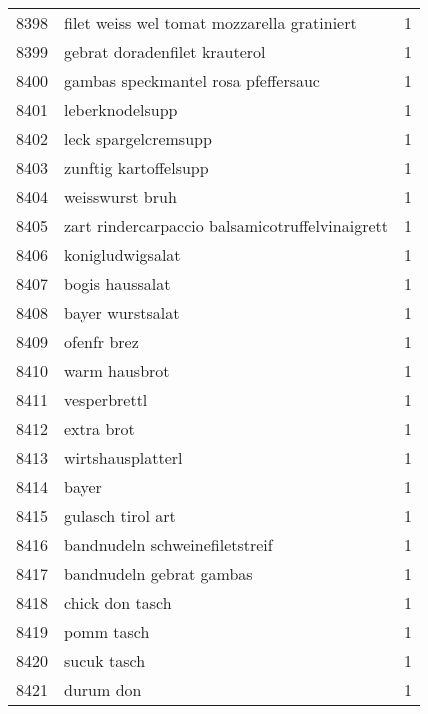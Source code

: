 \begin{tabular}{llr}
8398 &        filet weiss wel tomat mozzarella gratiniert &      1 \\
8399 &                      gebrat doradenfilet krauterol &      1 \\
8400 &                gambas speckmantel rosa pfeffersauc &      1 \\
8401 &                                    leberknodelsupp &      1 \\
8402 &                               leck spargelcremsupp &      1 \\
8403 &                              zunftig kartoffelsupp &      1 \\
8404 &                                    weisswurst bruh &      1 \\
8405 &    zart rindercarpaccio balsamicotruffelvinaigrett &      1 \\
8406 &                                   konigludwigsalat &      1 \\
8407 &                                    bogis haussalat &      1 \\
8408 &                                   bayer wurstsalat &      1 \\
8409 &                                        ofenfr brez &      1 \\
8410 &                                      warm hausbrot &      1 \\
8411 &                                       vesperbrettl &      1 \\
8412 &                                         extra brot &      1 \\
8413 &                                  wirtshausplatterl &      1 \\
8414 &                                              bayer &      1 \\
8415 &                                  gulasch tirol art &      1 \\
8416 &                     bandnudeln schweinefiletstreif &      1 \\
8417 &                           bandnudeln gebrat gambas &      1 \\
8418 &                                    chick don tasch &      1 \\
8419 &                                         pomm tasch &      1 \\
8420 &                                        sucuk tasch &      1 \\
8421 &                                          durum don &      1 \\

\end{tabular}
